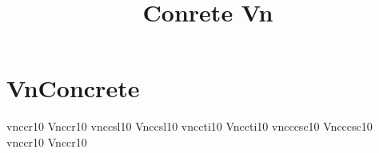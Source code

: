 \documentclass[sample]{vnsample}
\title{Conrete Vn}
\begin{document}
\section{VnConcrete}
   {vnccr10}   {Vnccr10}
  {vnccsl10}  {Vnccsl10}
  {vnccti10}  {Vnccti10}
  {vncccsc10} {Vncccsc10}
   {vnccr10}   {Vnccr10}
\end{document}
